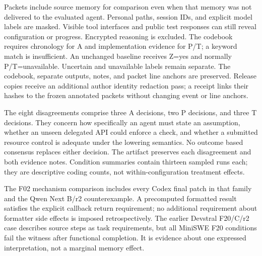Packets include source memory for comparison even when that memory was not delivered to the evaluated agent. Personal paths, session IDs, and explicit model labels are masked. Visible tool interfaces and public test responses can still reveal configuration or progress. Encrypted reasoning is excluded. The codebook requires chronology for A and implementation evidence for P/T; a keyword match is insufficient. An unchanged baseline receives Z=yes and normally P/T=unavailable. Uncertain and unavailable labels remain separate. The codebook, separate outputs, notes, and packet line anchors are preserved. Release copies receive an additional author identity redaction pass; a receipt links their hashes to the frozen annotated packets without changing event or line anchors.

\begin{table}[ht]
\centering\small
\caption{Full label distributions. ``Paired resolved'' counts records labeled yes or no by both passes. Four-category Cohen's $\kappa$ includes uncertain and unavailable labels and describes these two LLM passes; it is not human annotation reliability or label validation.}
\end{table}

The eight disagreements comprise three A decisions, two P decisions, and three T decisions. They concern how specifically an agent must state an assumption, whether an unseen delegated API could enforce a check, and whether a submitted resource control is adequate under the lowering semantics. No outcome based consensus replaces either decision. The artifact preserves each disagreement and both evidence notes. Condition summaries contain thirteen sampled runs each; they are descriptive coding counts, not within-configuration treatment effects.

\begin{table}[htbp]
\centering\small
\caption{Three matched transcript, implementation, and outcome panels, all GPT-5.5 Low/Codex. Quotes are exact saved visible excerpts; implementation summaries refer to final patches. Panel A compares repetitions within C; panels B and C compare conditions in repetition 1. These cases were selected after outcome inspection, separately from the systematic sample.}
\label{tab:cases}
\end{table}

The F02 mechanism comparison includes every Codex final patch in that family and the Qwen Next B/r2 counterexample. A precomputed formatted result satisfies the explicit callback return requirement; no additional requirement about formatter side effects is imposed retrospectively. The earlier Devstral F20/C/r2 case describes source steps as task requirements, but all MiniSWE F20 conditions fail the witness after functional completion. It is evidence about one expressed interpretation, not a marginal memory effect.

